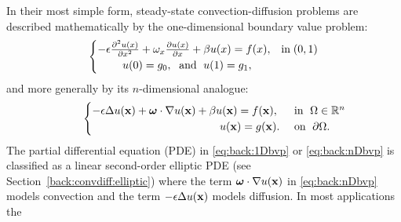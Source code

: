 In their most simple form, steady-state convection-diffusion problems are
described mathematically by the one-dimensional boundary value problem:
%
\begin{equation}\label{eq:back:1Dbvp}
\begin{cases}
-\epsilon\frac{\partial^2 u(x)}{\partial x^2}+\omega_x \frac{\partial u(x)}{\partial x} + \beta u(x)=f(x), & \text{in}\; (0,1)\\
\hspace{0.8cm} u(0)=g_0,\;\text{ and }\;u(1)=g_1, &
\end{cases}
\end{equation}
%
and more generally by its $n$-dimensional analogue:
%
\begin{equation}\label{eq:back:nDbvp}
\hspace*{2em}
\begin{cases}
-\epsilon \Delta u(\x) + \om \cdot \nabla u(\x)+\beta u(\x) = f(\x), &
\text{ in }\; \Omega\in\Re^n\\
\hspace{4.1cm} u(\x)=g(\x). & \text{ on }\; \partial \Omega.
\end{cases}
\end{equation}
%
The partial differential equation (PDE) in \eqref{eq:back:1Dbvp} or
\eqref{eq:back:nDbvp} is classified as a linear second-order elliptic PDE
(see Section~\ref{back:convdiff:elliptic}) where
the term $\bm{\omega}\cdot\nabla u(\mathbf{x})$ in \eqref{eq:back:nDbvp} models convection and
the term $-\epsilon\Delta u(\mathbf{x})$ models diffusion. In most applications the
